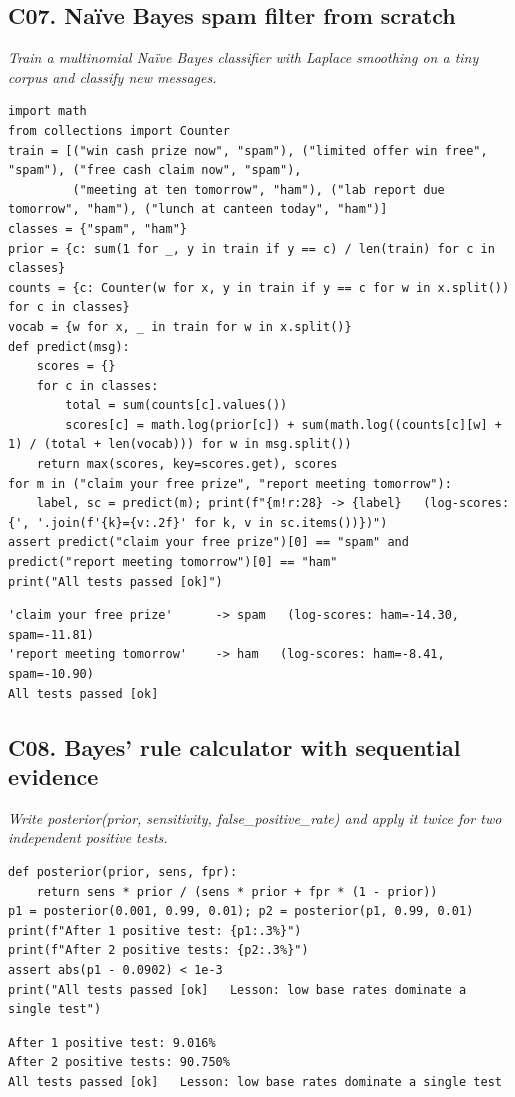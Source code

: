 \documentclass[11pt]{article}
\begin{document}
\subsection*{C07. Na\"{i}ve Bayes spam filter from scratch \hfill{}}
\textit{Train a multinomial Na\"{i}ve Bayes classifier with Laplace smoothing on a tiny corpus and classify new messages.}
\begin{lstlisting}[style=py]
import math
from collections import Counter
train = [("win cash prize now", "spam"), ("limited offer win free", "spam"), ("free cash claim now", "spam"),
         ("meeting at ten tomorrow", "ham"), ("lab report due tomorrow", "ham"), ("lunch at canteen today", "ham")]
classes = {"spam", "ham"}
prior = {c: sum(1 for _, y in train if y == c) / len(train) for c in classes}
counts = {c: Counter(w for x, y in train if y == c for w in x.split()) for c in classes}
vocab = {w for x, _ in train for w in x.split()}
def predict(msg):
    scores = {}
    for c in classes:
        total = sum(counts[c].values())
        scores[c] = math.log(prior[c]) + sum(math.log((counts[c][w] + 1) / (total + len(vocab))) for w in msg.split())
    return max(scores, key=scores.get), scores
for m in ("claim your free prize", "report meeting tomorrow"):
    label, sc = predict(m); print(f"{m!r:28} -> {label}   (log-scores: {', '.join(f'{k}={v:.2f}' for k, v in sc.items())})")
assert predict("claim your free prize")[0] == "spam" and predict("report meeting tomorrow")[0] == "ham"
print("All tests passed [ok]")
\end{lstlisting}
\begin{lstlisting}[style=out]
'claim your free prize'      -> spam   (log-scores: ham=-14.30, spam=-11.81)
'report meeting tomorrow'    -> ham   (log-scores: ham=-8.41, spam=-10.90)
All tests passed [ok]
\end{lstlisting}
\subsection*{C08. Bayes' rule calculator with sequential evidence \hfill{}}
\textit{Write posterior(prior, sensitivity, false\_positive\_rate) and apply it twice for two independent positive tests.}
\begin{lstlisting}[style=py]
def posterior(prior, sens, fpr):
    return sens * prior / (sens * prior + fpr * (1 - prior))
p1 = posterior(0.001, 0.99, 0.01); p2 = posterior(p1, 0.99, 0.01)
print(f"After 1 positive test: {p1:.3%}")
print(f"After 2 positive tests: {p2:.3%}")
assert abs(p1 - 0.0902) < 1e-3
print("All tests passed [ok]   Lesson: low base rates dominate a single test")
\end{lstlisting}
\begin{lstlisting}[style=out]
After 1 positive test: 9.016%
After 2 positive tests: 90.750%
All tests passed [ok]   Lesson: low base rates dominate a single test
\end{lstlisting}
\end{document}

